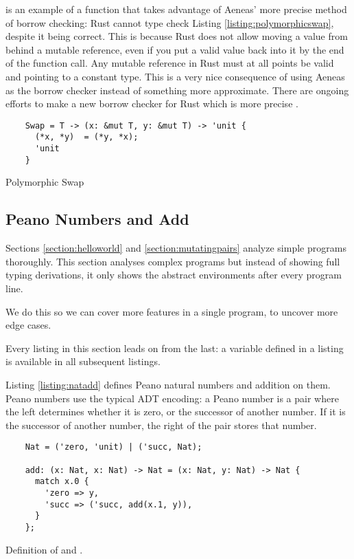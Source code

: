 \documentclass[12pt,twoside]{report}
\begin{document}
 is an example of a function that takes advantage of Aeneas' more precise method of borrow checking: Rust cannot type check Listing \ref{listing:polymorphicswap}, despite it being correct. This is because Rust does not allow moving a value from behind a mutable reference, even if you put a valid value back into it by the end of the function call. Any mutable reference in Rust must at all points be valid and pointing to a constant type. This is a very nice consequence of using Aeneas as the borrow checker instead of something more approximate. There are ongoing efforts to make a new borrow checker for Rust which is more precise \citep{PoloniusCurrentStatus}.

\begin{listing}
  \begin{verbatim}
    Swap = T -> (x: &mut T, y: &mut T) -> 'unit {
      (*x, *y)  = (*y, *x);
      'unit
    }
  \end{verbatim}
  \caption{Polymorphic Swap}
  \label{listing:polymorphicswap}
\end{listing}


\subsection{Peano Numbers and Add}
Sections \ref{section:helloworld} and \ref{section:mutatingpairs} analyze simple programs thoroughly. This section analyses complex programs but instead of showing full typing derivations, it only shows the abstract environments after every program line.

We do this so we can cover more features in a single program, to uncover more edge cases.

Every listing in this section leads on from the last: a variable defined in a listing is available in all subsequent listings.

Listing \ref{listing:natadd} defines Peano natural numbers and addition on them. Peano numbers use the typical ADT encoding: a Peano number is a pair where the left determines whether it is zero, or the successor of another number. If it is the successor of another number, the right of the pair stores that number.

\begin{listing}
  \begin{verbatim}
    Nat = ('zero, 'unit) | ('succ, Nat);

    add: (x: Nat, x: Nat) -> Nat = (x: Nat, y: Nat) -> Nat {
      match x.0 {
        'zero => y,
        'succ => ('succ, add(x.1, y)),
      }
    };
  \end{verbatim}
  \caption{Definition of  and .}
  \label{listing:natadd}
\end{listing}
\end{document}
